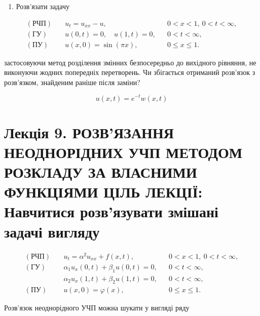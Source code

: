 \documentclass[
  ukrainian,
]{article}
\providecommand{\tightlist}{%
  \setlength{\itemsep}{0pt}\setlength{\parskip}{0pt}}
\begin{document}
\begin{enumerate}
\def\labelenumi{\arabic{enumi}.}
\setcounter{enumi}{2}
\tightlist
\item
  Розв'язати задачу
\end{enumerate}

\[
\begin{aligned}
(\text{РЧП})\quad & u_t = u_{xx} - u, && 0 < x < 1,\ 0 < t < \infty, \\
(\text{ГУ})\quad & u(0,t) = 0,\quad u(1,t) = 0, && 0 < t < \infty, \\
(\text{ПУ})\quad & u(x,0) = \sin(\pi x), && 0 \leqslant x \leqslant 1.
\end{aligned}
\]

застосовуючи метод розділення змінних безпосередньо до вихідного
рівняння, не виконуючи жодних попередніх перетворень. Чи збігається
отриманий розв'язок з розв'язком, знайденим раніше після заміни?

\[
u(x,t) = e^{-t}w(x,t)
\]

\section{Лекція 9. РОЗВ'ЯЗАННЯ НЕОДНОРІДНИХ УЧП МЕТОДОМ РОЗКЛАДУ ЗА
ВЛАСНИМИ ФУНКЦІЯМИ ЦІЛЬ ЛЕКЦІЇ: Навчитися розв'язувати змішані задачі
вигляду}\label{ux43bux435ux43aux446ux456ux44f-9.-ux440ux43eux437ux432ux44fux437ux430ux43dux43dux44f-ux43dux435ux43eux434ux43dux43eux440ux456ux434ux43dux438ux445-ux443ux447ux43f-ux43cux435ux442ux43eux434ux43eux43c-ux440ux43eux437ux43aux43bux430ux434ux443-ux437ux430-ux432ux43bux430ux441ux43dux438ux43cux438-ux444ux443ux43dux43aux446ux456ux44fux43cux438-ux446ux456ux43bux44c-ux43bux435ux43aux446ux456ux457-ux43dux430ux432ux447ux438ux442ux438ux441ux44f-ux440ux43eux437ux432ux44fux437ux443ux432ux430ux442ux438-ux437ux43cux456ux448ux430ux43dux456-ux437ux430ux434ux430ux447ux456-ux432ux438ux433ux43bux44fux434ux443}

\[
\begin{aligned}
(\text{РЧП})\quad & u_t = \alpha^2 u_{xx} + f(x,t), && 0 < x < 1,\ 0 < t < \infty, \\
(\text{ГУ})\quad & \alpha_1 u_x(0,t) + \beta_1 u(0,t) = 0, && 0 < t < \infty, \\
& \alpha_2 u_x(1,t) + \beta_2 u(1,t) = 0, && 0 < t < \infty, \\
(\text{ПУ})\quad & u(x,0) = \varphi(x), && 0 \leqslant x \leqslant 1.
\end{aligned}
\]

Розв'язок неоднорідного УЧП можна шукати у вигляді ряду
\end{document}
